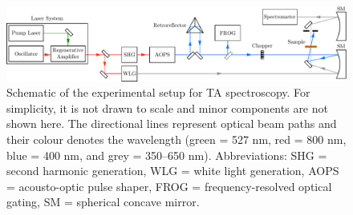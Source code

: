 \begin{figure}[t!]
  \centering
  \includegraphics[width = \textwidth]{Figures/fig_ch2_setup-TA.pdf}
  \caption[Schematic of the experimental setup for TA spectroscopy.]{
    Schematic of the experimental setup for TA spectroscopy.
    For simplicity, it is not drawn to scale and minor components are not shown here.
    The directional lines represent optical beam paths and
    their colour denotes the wavelength
    (green = 527 nm, red = 800 nm, blue = 400 nm, and grey = 350--650 nm).
    Abbreviations: SHG = second harmonic generation, WLG = white light generation,
    AOPS = acousto-optic pulse shaper, FROG = frequency-resolved optical gating,
    SM = spherical concave mirror.
  }
  \label{fig: TA-setup}
\end{figure}

